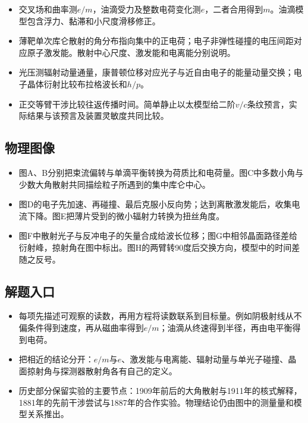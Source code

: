 \documentclass[UTF8,fontset=fandol,a4paper,11pt]{ctexart}
\begin{document}
\begin{itemize}
\item 交叉场和曲率测$e/m$，油滴受力及整数电荷变化测$e$，二者合用得到$m$。油滴模型包含浮力、黏滞和小尺度滑移修正。
\item 薄靶单次库仑散射的角分布指向集中的正电荷；电子非弹性碰撞的电压间距对应原子激发能。散射中心尺度、激发能和电离能分别说明。
\item 光压测辐射动量通量，康普顿位移对应光子与近自由电子的能量动量交换；电子晶体衍射比较布拉格波长和$h/p$。
\item 正交等臂干涉比较往返传播时间。简单静止以太模型给二阶$v/c$条纹预言，实际结果与该预言及装置灵敏度共同比较。
\end{itemize}



\subsection*{物理图像}

\begin{itemize}
\item 图A、B分别把束流偏转与单滴平衡转换为荷质比和电荷量。图C中多数小角与少数大角散射共同描绘粒子所遇到的集中库仑中心。
\item 图D的电子先加速、再碰撞、最后克服小反向势；达到离散激发能后，收集电流下降。图E把薄片受到的微小辐射力转换为扭丝角度。
\item 图F中散射光子与反冲电子的矢量合成给波长位移；图G中相邻晶面路径差给衍射峰，掠射角在图中标出。图H的两臂转90度后交换方向，模型中的时间差随之反号。
\end{itemize}



\subsection*{解题入口}

\begin{itemize}
\item 每项先描述可观察的读数，再用方程将读数联系到目标量。例如阴极射线从不偏条件得到速度，再从磁曲率得到$e/m$；油滴从终速得到半径，再由电平衡得到电荷。
\item 把相近的结论分开：$e/m$与$e$、激发能与电离能、辐射动量与单光子碰撞、晶面掠射角与探测器散射角各有自己的定义。
\item 历史部分保留实验的主要节点：1909年前后的大角散射与1911年的核式解释，1881年的先前干涉尝试与1887年的合作实验。物理结论仍由图中的测量量和模型关系推出。
\end{itemize}
\end{document}
